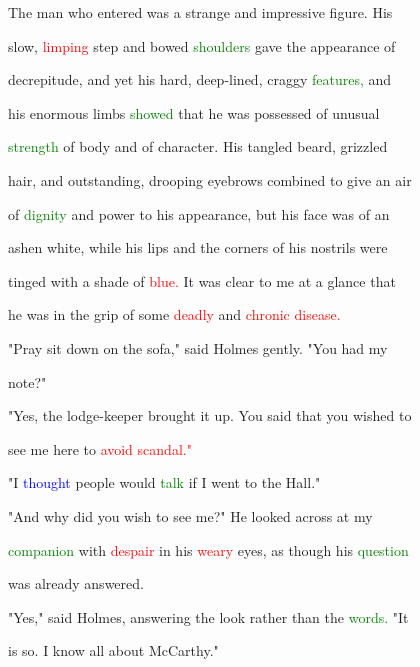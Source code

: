  The man who entered was a strange and impressive figure. His

 slow, \textcolor{red}{limping} step and bowed \textcolor{green}{shoulders} gave the appearance of

 decrepitude, and yet his hard, deep-lined, craggy \textcolor{green}{features,} and

 his enormous limbs \textcolor{green}{showed} that he was \textcolor{BurntOrange}{possessed} of unusual

 \textcolor{green}{strength} of body and of character. His tangled beard, grizzled

 hair, and \textcolor{BurntOrange}{outstanding,} drooping eyebrows combined to give an air

 of \textcolor{green}{dignity} and power to his appearance, but his face was of an

 ashen \textcolor{BurntOrange}{white,} while his lips and the corners of his nostrils were

 tinged with a shade of \textcolor{red}{blue.} It was clear to me at a glance that

 he was in the grip of some \textcolor{red}{deadly} and \textcolor{red}{chronic} \textcolor{red}{disease.}



 \textcolor{BurntOrange}{"Pray} sit down on the sofa," said Holmes gently. "You had my

 note?"



 "Yes, the lodge-keeper brought it up. You said that you wished to

 see me here to \textcolor{red}{avoid} \textcolor{red}{scandal."}



 "I \textcolor{blue}{thought} people would \textcolor{green}{talk} if I went to the Hall."



 "And why did you wish to see me?" He looked across at my

 \textcolor{green}{companion} with \textcolor{red}{despair} in his \textcolor{red}{weary} eyes, as though his \textcolor{green}{question}

 was already answered.



 "Yes," said Holmes, answering the look rather than the \textcolor{green}{words.} "It

 is so. I know all about McCarthy."



